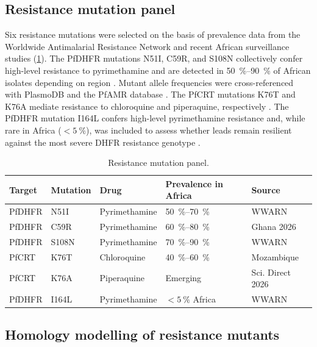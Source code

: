 \documentclass[11pt,a4paper]{article}
\begin{document}
\subsection{Resistance mutation panel}

Six resistance mutations were selected on the basis of prevalence data from the Worldwide Antimalarial Resistance Network \citep{wwarn_2026} and recent African surveillance studies (\cref{tab:mutations}). The PfDHFR mutations N51I, C59R, and S108N collectively confer high-level resistance to pyrimethamine and are detected in \qtyrange{50}{90}{\percent} of African isolates depending on region \citep{africa_resistance_2026}. Mutant allele frequencies were cross-referenced with PlasmoDB \citep{plasmodb_2026} and the PfAMR database \citep{pfamr_2026}. The PfCRT mutations K76T and K76A mediate resistance to chloroquine and piperaquine, respectively \citep{computational_mutations_2025}. The PfDHFR mutation I164L confers high-level pyrimethamine resistance and, while rare in Africa ($< \qty{5}{\percent}$), was included to assess whether leads remain resilient against the most severe DHFR resistance genotype \citep{africa_resistance_2026}.

\begin{table}[htbp]
\centering
\caption{Resistance mutation panel.}
\label{tab:mutations}
\begin{tabularx}{\textwidth}{l l l X l}
\toprule
Target & Mutation & Drug & Prevalence in Africa & Source \\
\midrule
PfDHFR & N51I & Pyrimethamine & \qtyrange{50}{70}{\percent} & WWARN \\
PfDHFR & C59R & Pyrimethamine & \qtyrange{60}{80}{\percent} & Ghana 2026 \\
PfDHFR & S108N & Pyrimethamine & \qtyrange{70}{90}{\percent} & WWARN \\
PfCRT & K76T & Chloroquine & \qtyrange{40}{60}{\percent} & Mozambique \\
PfCRT & K76A & Piperaquine & Emerging & Sci. Direct 2026 \\
PfDHFR & I164L & Pyrimethamine & $< \qty{5}{\percent}$ Africa & WWARN \\
\bottomrule
\end{tabularx}
\end{table}

\subsection{Homology modelling of resistance mutants}
\end{document}
